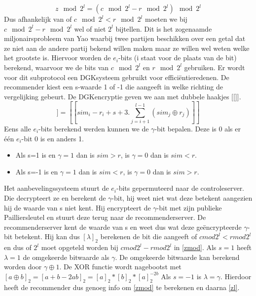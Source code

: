 \begin{equation}
\label{zmod}z\mod 2^l = (c\mod 2^l - r\mod 2^l)\mod 2^l \end{equation}
Dus afhankelijk van of $c\mod 2^l < r\mod 2^l$ moeten we bij $c\mod 2^l - r\mod 2^l$ wel of niet $2^l$ bijtellen. Dit is het zogenaamde miljonairsprobleem van Yao waarbij twee partijen beschikken over een getal dat ze niet aan de andere partij bekend willen maken maar ze willen wel weten welke het grootste is. Hiervoor worden de $e_i$-bits (i staat voor de plaats van de bit) berekend, waarvoor we de bits van $c \mod2^l$ en $r \mod 2^l$ gebruiken. Er wordt voor dit subprotocol een DGKsysteem gebruikt voor effici\"entieredenen.  De recommender kiest een s-waarde 1 of -1 die aangeeft in welke richting de vergelijking gebeurt. De DGKencryptie geven we aan met dubbele haakjes [[]].
\begin{equation}
[[e_i]]=[[sim_i - r_i + s+ 3.\sum_{j=i+1}^{l-1}(sim_j \oplus r_j)]]
\end{equation}
Eens alle $e_i$-bits berekend werden kunnen we de $\gamma$-bit bepalen. Deze is 0 als er \'e\'en $e_i$-bit 0 is en anders 1.
\begin{itemize}
 
\item Als s=1 is en $\gamma = 1$  dan is $sim > r$, is $\gamma=0$ dan is $sim< r$.
\item  Als s=-1 is en $\gamma = 1$  dan is $sim < r$, is $\gamma=0$ dan is $sim> r$.
\end{itemize}   Het aanbevelingssysteem stuurt de $e_i$-bits gepermuteerd naar de controleserver. Die decrypteert ze en berekent de $\gamma$-bit, hij weet niet wat deze betekent aangezien hij de waarde van s niet kent. Hij encrypteert de $\gamma$-bit met zijn publieke Pailliersleutel en stuurt deze terug naar de recommenderserver. De recommenderserver kent de waarde van s en weet dus wat deze ge\"encrypteerde $\gamma$-bit betekent. Hij kan dus $[\lambda]_2$ berekenen de bit die aangeeft of $cmod2^l < rmod2^l$ en dus of $2^l$ moet opgeteld worden bij $cmod2^l - rmod2^l$ in \ref{zmod}.
Als $s = 1$ heeft  $\lambda=1$ de omgekeerde bitwaarde als $\gamma$. De omgekeerde bitwaarde kan berekend worden door  $\gamma \oplus 1$. De XOR functie wordt nagebootst met $[a \oplus b]_2= [a + b - 2ab]_2 = [a]_2*[b]_2*[a]_2^{-2b}$ Als $s =-1$ is $\lambda = \gamma$. Hierdoor heeft de recommender dus genoeg info om \ref{zmod} te berekenen en daarna \ref{zl}.
